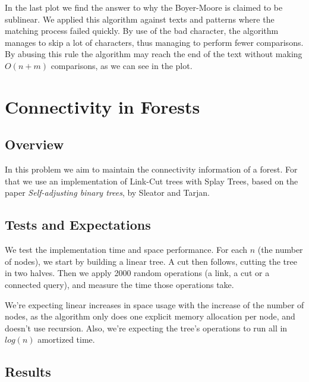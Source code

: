 \documentclass[12pt, a4paper]{article}
\begin{document}
In the last plot we find the answer to why the Boyer-Moore is claimed to be
sublinear. We applied this algorithm against texts and patterns where the
matching process failed quickly. By use of the bad character, the algorithm
manages to skip a lot of characters, thus managing to perform fewer comparisons.
By abusing this rule the algorithm may reach the end of the text without making
$O(n+m)$ comparisons, as we can see in the plot.

\section{Connectivity in Forests}
\subsection{Overview}
In this problem we aim to maintain the connectivity information of a forest. For
that we use an implementation of Link-Cut trees with Splay Trees, based on the
paper \textit{Self-adjusting binary trees}, by Sleator and Tarjan. 
\subsection{Tests and Expectations}
We test the implementation time and space performance. For each $n$ (the number
of nodes), we start by building a linear tree. A cut then follows, cutting the
tree in two halves. Then we apply 2000 random operations (a link, a cut or
a connected query), and measure the time those operations take.

We're expecting linear increases in space usage with the increase of the number
of nodes, as the algorithm only does one explicit memory allocation per node,
and doesn't use recursion. Also, we're expecting the tree's operations to run
all in $log(n)$ amortized time.

\subsection{Results}
\end{document}

